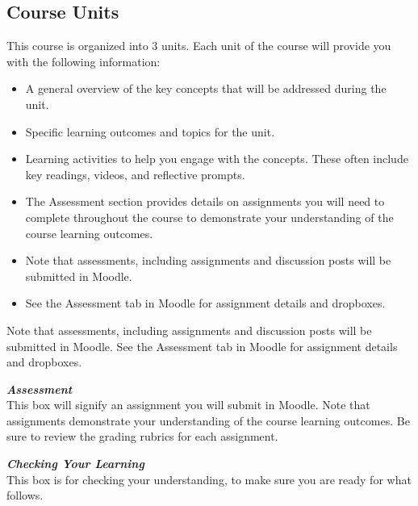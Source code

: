 \documentclass[
]{book}
\providecommand{\tightlist}{%
  \setlength{\itemsep}{0pt}\setlength{\parskip}{0pt}}
\begin{document}
\hypertarget{course-units}{%
\subsection*{Course Units}\label{course-units}}

This course is organized into 3 units. Each unit of the course will provide you with the following information:

\begin{itemize}
\tightlist
\item
  A general overview of the key concepts that will be addressed during the unit.\\
\item
  Specific learning outcomes and topics for the unit.\\
\item
  Learning activities to help you engage with the concepts. These often include key readings, videos, and reflective prompts.\\
\item
  The Assessment section provides details on assignments you will need to complete throughout the course to demonstrate your understanding of the course learning outcomes.\\
\item
  Note that assessments, including assignments and discussion posts will be submitted in Moodle.\\
\item
  See the Assessment tab in Moodle for assignment details and dropboxes.
\end{itemize}

\begin{caution}
Note that assessments, including assignments and discussion posts will
be submitted in Moodle. See the Assessment tab in Moodle for assignment
details and dropboxes.
\end{caution}

\begin{assessment}
\textbf{\emph{Assessment}}\\
This box will signify an assignment you will submit in Moodle. Note that
assignments demonstrate your understanding of the course learning
outcomes. Be sure to review the grading rubrics for each assignment.
\end{assessment}

\begin{progress}
\textbf{\emph{Checking Your Learning}}\\
This box is for checking your understanding, to make sure you are ready
for what follows.
\end{progress}
\end{document}

